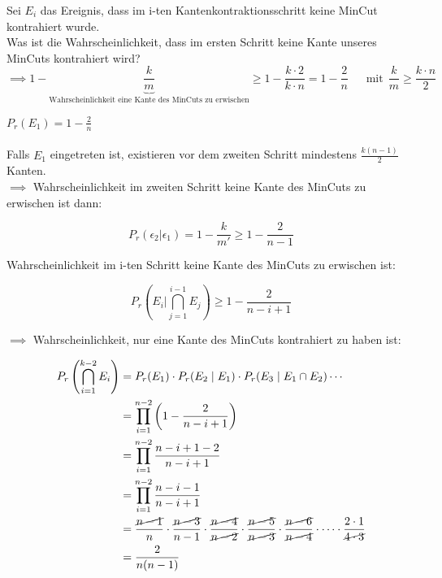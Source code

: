 \documentclass{article}
\begin{document}
Sei $E_i$ das Ereignis, dass im i-ten Kantenkontraktionsschritt keine MinCut kontrahiert wurde.\\
Was ist die Wahrscheinlichkeit, dass im ersten Schritt keine Kante unseres MinCuts kontrahiert wird?\\
\[\implies 1 - \underbrace{\frac{k}{m}}_{\text{Wahrscheinlichkeit eine Kante des MinCuts zu erwischen}} \geq 1 - \frac{k \cdot 2}{k \cdot n} = 1 - \frac{2}{n} \ \ \ \ \ \ \ \text{mit} \ \ \frac{k}{m} \geq \frac{k \cdot n}{2}\]


$P_r(E_1)= 1-\frac{2}{n}$\\
\\
Falls $E_1$ eingetreten ist, existieren vor dem zweiten Schritt mindestens $\frac{k(n-1)}{2}$ Kanten.\\
$\implies$ Wahrscheinlichkeit im zweiten Schritt keine Kante des MinCuts zu erwischen ist dann:

\[ P_r(\epsilon_2 | \epsilon_1) = 1- \frac{k}{m'} \geq 1 - \frac{2}{n-1}\] 

Wahrscheinlichkeit im i-ten Schritt keine Kante des MinCuts zu erwischen ist: 

\[ P_r(E_i | \bigcap_{j=1}^{i-1} E_j) \geq 1 - \frac{2}{n-i+1} \] 

$\implies$ Wahrscheinlichkeit, nur eine Kante des MinCuts kontrahiert zu haben ist:

\begin{align*}
    P_r\left(\bigcap_{i=1}^{k-2} E_i\right) &= P_r(E_1) \cdot P_r(E_2 \mid E_1) \cdot P_r(E_3 \mid E_1 \cap E_2) \cdots \\
                                            &= \prod_{i=1}^{n-2} \left(1 - \frac{2}{n-i+1}\right) \\
                                            &= \prod_{i=1}^{n-2} \frac{n-i+1-2}{n-i+1} \\
                                            &= \prod_{i=1}^{n-2} \frac{n-i-1}{n-i+1} \\
                                            &= \frac{\cancel{n-1}}{n} \cdot \frac{\cancel{n-3}}{n-1} \cdot \frac{\cancel{n-4}}{\cancel{n-2}} \cdot \frac{\cancel{n-5}}{\cancel{n-3}} \cdot \frac{\cancel{n-6}}{\cancel{n-4}} \cdot \dots \cdot \frac{2 \cdot 1}{\cancel{4 \cdot 3}} \\
                                            &= \frac{2}{n(n-1)}
\end{align*}
\end{document}
